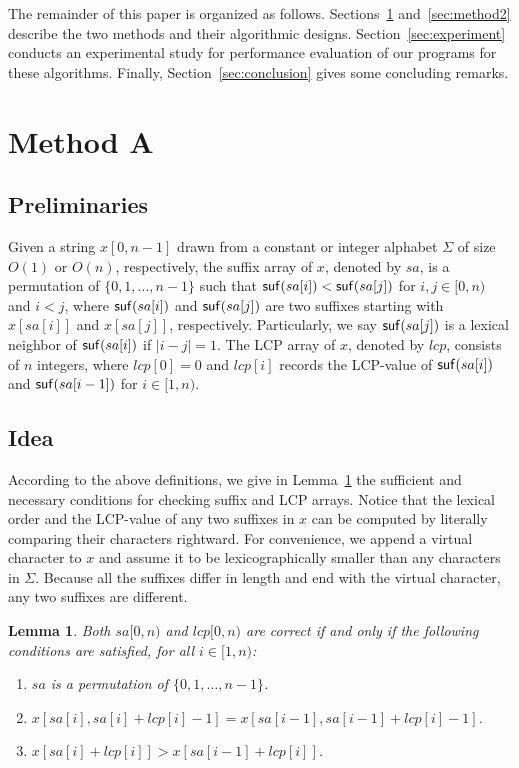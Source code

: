 \documentclass[10pt,journal,compsoc]{IEEEtran}
\newtheorem{Lemma}{Lemma}
\begin{document}
The remainder of this paper is organized as follows. Sections~\ref{sec:method1} and~\ref{sec:method2} describe the two methods and their algorithmic designs. Section~\ref{sec:experiment} conducts an experimental study for performance evaluation of our programs for these algorithms. Finally, Section~\ref{sec:conclusion} gives some concluding remarks. 

\section{Method A} \label{sec:method1}


\subsection{Preliminaries} \label{sec:method1:notations}

Given a string $x[0, n-1]$ drawn from a constant or integer alphabet $\Sigma$ of size $O(1)$ or $O(n)$, respectively, the suffix array of $x$, denoted by $sa$, is a permutation of $\{0, 1, ..., n - 1\}$ such that ${\sf suf}(sa[i]) < {\sf suf}(sa[j])$ for $i, j \in [0, n)$ and $i < j$, where ${\sf suf}(sa[i])$ and ${\sf suf}(sa[j])$ are two suffixes starting with $x[sa[i]]$ and $x[sa[j]]$, respectively. Particularly, we say ${\sf suf}(sa[j])$ is a lexical neighbor of ${\sf suf}(sa[i])$ if $|i - j| = 1$. The LCP array of $x$, denoted by $lcp$, consists of $n$ integers, where $lcp[0]=0$ and $lcp[i]$ records the LCP-value of ${\sf suf}(sa[i])$ and ${\sf suf}(sa[i - 1])$ for $i \in [1, n)$. 

\subsection{Idea} \label{sec:method1:idea}

According to the above definitions, we give in Lemma~\ref{lemma:1} the sufficient and necessary conditions for checking suffix and LCP arrays. Notice that the lexical order and the LCP-value of any two suffixes in $x$ can be computed by literally comparing their characters rightward. For convenience, we append a virtual character to $x$ and assume it to be lexicographically smaller than any characters in $\Sigma$. Because all the suffixes differ in length and end with the virtual character, any two suffixes are different.


\begin{Lemma} \label{lemma:1}
	Both $sa[0, n)$ and $lcp[0, n)$ are correct if and only if the following conditions are satisfied, for all $i \in [1, n)$:
	\begin{enumerate}[(1)]
		\item
		$sa$ is a permutation of $\{0, 1, \dots, n - 1\}$.
		\item
		$x[sa[i], sa[i] + lcp[i] - 1] = x[sa[i - 1], sa[i - 1] + lcp[i] - 1]$.
		\item
		$x[sa[i] + lcp[i]] > x[sa[i - 1] + lcp[i]]$. 	
	\end{enumerate}
\end{Lemma}
\end{document}

